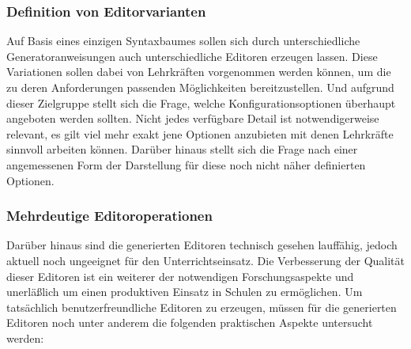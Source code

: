 \documentclass[paper=a4,fontsize=11pt,parskip=half]{scrartcl}
\begin{document}
\subsubsection{Definition von Editorvarianten}

Auf Basis eines einzigen Syntaxbaumes sollen sich durch unterschiedliche Generatoranweisungen auch unterschiedliche Editoren erzeugen lassen. Diese Variationen sollen dabei von Lehrkräften vorgenommen werden können, um die zu deren Anforderungen passenden Möglichkeiten bereitzustellen. Und aufgrund dieser Zielgruppe stellt sich die Frage, welche Konfigurationsoptionen überhaupt angeboten werden sollten. Nicht jedes verfügbare Detail ist notwendigerweise relevant, es gilt viel mehr exakt jene Optionen anzubieten mit denen Lehrkräfte sinnvoll arbeiten können. Darüber hinaus stellt sich die Frage nach einer angemessenen Form der Darstellung für diese noch nicht näher definierten Optionen.

\subsubsection{Mehrdeutige Editoroperationen}

Darüber hinaus sind die generierten Editoren technisch gesehen lauffähig, jedoch aktuell noch ungeeignet für den Unterrichtseinsatz. Die Verbesserung der Qualität dieser Editoren ist ein weiterer der notwendigen Forschungsaspekte und unerläßlich um einen produktiven Einsatz in Schulen zu ermöglichen. Um tatsächlich benutzerfreundliche Editoren zu erzeugen, müssen für die generierten Editoren noch unter anderem die folgenden praktischen Aspekte untersucht werden:
\end{document}
